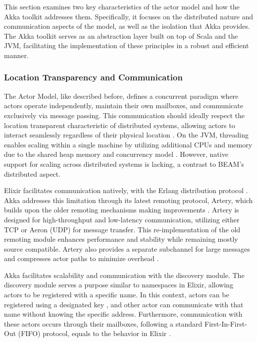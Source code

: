 This section examines two key characteristics of the actor model and how the Akka toolkit addresses them. Specifically, it focuses on the distributed nature and communication aspects of the model, as well as the isolation that Akka provides. The Akka toolkit serves as an abstraction layer built on top of Scala and the \gls{JVM}, facilitating the implementation of these principles in a robust and efficient manner.

\subsubsection{Location Transparency and Communication}

The Actor Model, like described before, defines a concurrent paradigm where actors operate independently, maintain their own mailboxes, and communicate exclusively via message passing. This communication should ideally respect the location transparent characteristic of distributed systems, allowing actors to interact seamlessly regardless of their physical location \cite{Armstrong2013}. On the JVM, threading enables scaling within a single machine by utilizing additional CPUs and memory due to the shared heap memory and concurrency model \cite{Abraham2023}. However, native support for scaling across distributed systems is lacking, a contrast to BEAM’s distributed aspect.

Elixir facilitates communication natively, with the Erlang distribution protocol \cite{elixir-school}. Akka addresses this limitation through its latest remoting protocol, Artery, which builds upon the older remoting mechanisms making improvements \cite{akka-docs,Abraham2023}. Artery is designed for high-throughput and low-latency communication, utilizing either \gls{TCP} or Aeron (UDP) for message transfer. This re-implementation of the old remoting module enhances performance and stability while remaining mostly source compatible. Artery also provides a separate subchannel for large messages and compresses actor paths to minimize overhead \cite{akka-docs}. 

Akka facilitates scalability and communication with the discovery module. The discovery module serves a purpose similar to namespaces in Elixir, allowing actors to be registered with a specific name. In this context, actors can be registered using a designated key \cite{Abraham2023}, and other actor can communicate with that name without knowing the specific address. Furthermore, communication with these actors occurs through their mailboxes, following a standard First-In-First-Out (FIFO) protocol, equals to the behavior in Elixir \cite{Moamen2027,Juric2024}.

